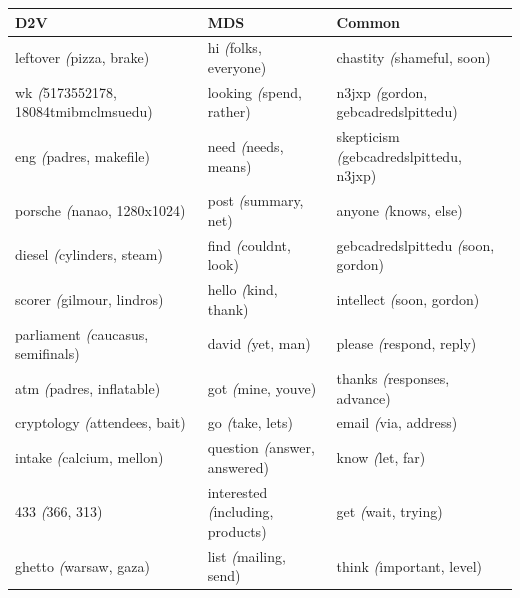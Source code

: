 \begin{table}[]
	\scriptsize
	\setlength\extrarowheight{-1pt}

	\begin{tabular}{lll}
		\textbf{D2V}                                    & \textbf{MDS}                              & \textbf{Common}                                     \\
		\toprule[\heavyrulewidth]
		leftover \textit({pizza, brake)}                & hi \textit({folks, everyone)}             & chastity \textit({shameful, soon)}                  \\
		wk \textit({5173552178, 18084tmibmclmsuedu)}    & looking \textit({spend, rather)}          & n3jxp \textit({gordon, gebcadredslpittedu)}         \\
		eng \textit({padres, makefile)}                 & need \textit({needs, means)}              & skepticism \textit({gebcadredslpittedu, n3jxp)}     \\
		porsche \textit({nanao, 1280x1024)}             & post \textit({summary, net)}              & anyone \textit({knows, else)}                       \\
		diesel \textit({cylinders, steam)}              & find \textit({couldnt, look)}             & gebcadredslpittedu \textit({soon, gordon)}          \\
		scorer \textit({gilmour, lindros)}              & hello \textit({kind, thank)}              & intellect \textit({soon, gordon)}                   \\
		parliament \textit({caucasus, semifinals)}      & david \textit({yet, man)}                 & please \textit({respond, reply)}                    \\
		atm \textit({padres, inflatable)}               & got \textit({mine, youve)}                & thanks \textit({responses, advance)}                \\
		cryptology \textit({attendees, bait)}           & go \textit({take, lets)}                  & email \textit({via, address)}                       \\
		intake \textit({calcium, mellon)}               & question \textit({answer, answered)}      & know \textit({let, far)}                            \\
		433 \textit({366, 313)}                         & interested \textit({including, products)} & get \textit({wait, trying)}                         \\
		ghetto \textit({warsaw, gaza)}                  & list \textit({mailing, send)}             & think \textit({important, level)}                   \\

\end{tabular}
\end{table}
